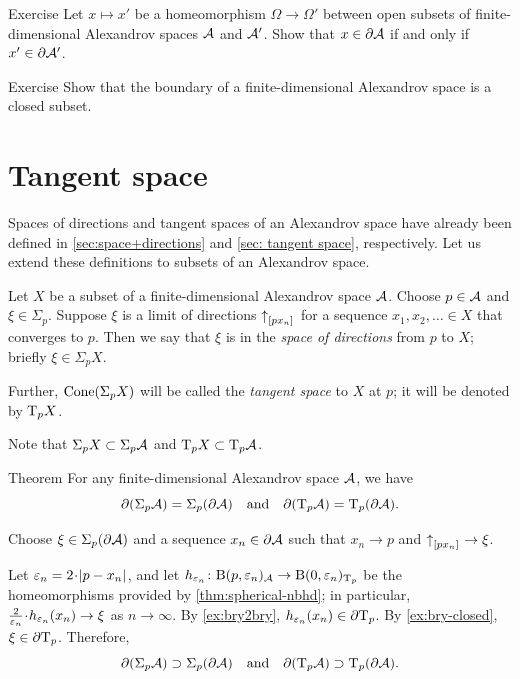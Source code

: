 \begin{thm}[!]{Exercise}\label{ex:bry2bry}
Let $x\mapsto x'$ be a homeomorphism $\Omega\to\Omega'$
between open subsets of finite-dimensional Alexandrov spaces $\mathcal{A}$ and $\mathcal{A}'$.
Show that $x\in \partial \mathcal{A}$ if and only if $x'\in \partial \mathcal{A}'$.
\end{thm}

\begin{thm}[!]{Exercise}\label{ex:bry-closed}
Show that the boundary of a finite-dimensional Alexandrov space is a closed subset.
\end{thm}

\section{Tangent space}

Spaces of directions and tangent spaces of an Alexandrov space have already been defined in \ref{sec:space+directions} and \ref{sec: tangent space}, respectively.
Let us extend these definitions to subsets of an Alexandrov space.

Let $X$ be a subset of a finite-dimensional Alexandrov space $\mathcal{A}$.
Choose $p\in \mathcal{A}$ and $\xi\in \Sigma_p$.
Suppose $\xi$ is a limit of directions ${\uparrow}_{[{p}{x_n}]_{{}}}$ for a sequence $x_1,x_2,\dots{}\in X$ that converges to $p$.
Then we say that $\xi$ is in the \emph{space of directions} from $p$ to $X$;
briefly $\xi\in\Sigma_pX$.

Further, $\mathop{\rm Cone}\nolimits(\Sigma_pX)$ will be called the \emph{tangent space} to $X$ at $p$;
it will be denoted by $\mathrm{T}_pX$.

Note that $\Sigma_pX\subset \Sigma_p\mathcal{A}$ and $\mathrm{T}_pX\subset\mathrm{T}_p\mathcal{A}$.

\begin{thm}{Theorem}\label{thm:partial-Sigma}
For any finite-dimensional Alexandrov space $\mathcal{A}$, we have
\[\partial (\Sigma_p\mathcal{A})=\Sigma_p(\partial\mathcal{A})
\quad\text{and}\quad
\partial(\mathrm{T}_p\mathcal{A})=\mathrm{T}_p(\partial\mathcal{A}).\]
\end{thm}

Choose $\xi\in\Sigma_p(\partial\mathcal{A})$ and a sequence $x_n\in \partial \mathcal{A}$ such that $x_n\to p$ and ${\uparrow}_{[{p}{x_n}]_{{}}}\to\xi$.

Let $\eps_n=2\cdot \dist{p}{x_n}{}$,
and let $h_{\varepsilon_n}\colon\mathrm{B}{}(p,\varepsilon_n)_{\mathcal{A}}\to \mathrm{B}{}(0,\varepsilon_n)_{\mathrm{T}_p}$ be the homeomorphisms provided by \ref{thm:spherical-nbhd};
in particular, $\tfrac2{\eps_n}\cdot h_{\eps_n}(x_n)\to \xi$ as $n\to\infty$.
By \ref{ex:bry2bry}, $h_{\varepsilon_n}(x_n)\in \partial \mathrm{T}_p$.
By \ref{ex:bry-closed}, $\xi\in \partial \mathrm{T}_p$.
Therefore,
\[\partial (\Sigma_p\mathcal{A})\supset\Sigma_p(\partial\mathcal{A})
\quad\text{and}\quad
\partial(\mathrm{T}_p\mathcal{A})\supset\mathrm{T}_p(\partial\mathcal{A}).\]

